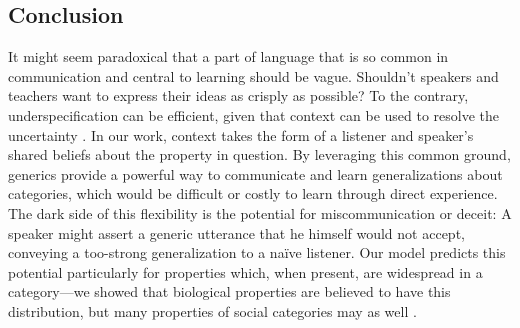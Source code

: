 \documentclass[12pt,letterpaper]{article}
\begin{document}




\subsection*{Conclusion}

It might seem paradoxical that a part of language that is so common in communication and central to learning should be vague. 
Shouldn't speakers and teachers want to express their ideas as crisply as possible?
To the contrary, underspecification can be efficient, given that context can be used to resolve the uncertainty \cite{Piantadosi2012}.
In our work, context takes the form of a listener and speaker's shared beliefs about the property in question. 
By leveraging this common ground, generics provide a powerful way to communicate and learn generalizations about categories, 
which would be difficult or costly to learn through direct experience.
The dark side of this flexibility is the potential for miscommunication or deceit: A speaker might assert a generic utterance that he himself would not accept, conveying a too-strong generalization to a na\"{i}ve listener.  
Our model predicts this potential particularly for properties which, when present, are widespread in a category---we showed that biological properties are believed to have this distribution, but many properties of social categories may as well \cite{Cimpian2011a,Cimpian2012b,Rhodes2012}.
\end{document}
